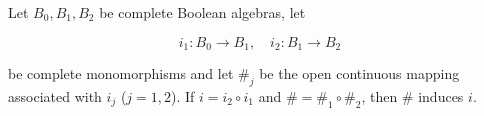 Let $B_0, B_1, B_2$ be complete Boolean algebras, let

$$i_1: B_0 \rightarrow B_1, \quad i_2: B_1 \rightarrow B_2$$

be complete monomorphisms and let $\#_j$ be the open continuous mapping associated with $i_j$ ($j = 1, 2$). If $i = i_2 \circ i_1$ and $\# = \#_1 \circ \#_2$, then $\#$ induces $i$.$$
